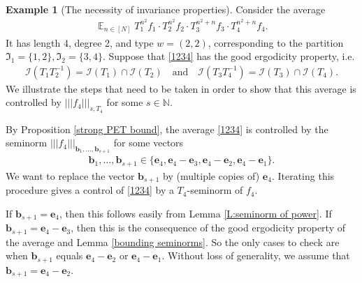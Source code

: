 \documentclass[11pt]{amsart}
\theoremstyle{definition}
\newtheorem{example}{Example}
\newcommand{\N}{{\mathbb N}}
\newcommand{\CI}{{\mathcal I}}
\newcommand{\FD}{{\mathfrak D}}
\newcommand{\FI}{{\mathfrak I}}
\newcommand{\be}{{\mathbf{e}}}
\renewcommand{\b}{{\textbf{b}}}
\newcommand{\nnorm}[1]{\lvert\!|\!| #1|\!|\!\rvert}
\newcommand{\inv}{^{-1}}
\DeclareMathOperator*{\E}{\mathbb{E}}
\begin{document}
\begin{example}[The necessity of invariance properties]\label{Ex: n^2, n^2, n^2+n, n^2+n}%
Consider the average
\begin{align}\label{1234}
     \E_{n\in[N]}T_1^{n^2}f_1 \cdot T_2^{n^2}f_2 \cdot T_3^{n^2+n}f_3 \cdot T_4^{n^2 + n} f_4.
\end{align}
It has length 4, degree 2, and type $w=(2,2)$, corresponding to the partition $\FI_1 = \{1, 2\}, \FI_2 = \{3, 4\}$. Suppose that \eqref{1234} has the good ergodicity property, i.e.
\begin{align*}
    \CI(T_1 T_2^{-1}) = \CI(T_1)\cap \CI(T_2)\quad \textrm{and}\quad \CI(T_3 T_4\inv) = \CI(T_3)\cap\CI(T_4).
\end{align*}
We illustrate the steps that need to be taken in order to show that this average is controlled by $\nnorm{f_4}_{s, T_4}$ for some $s\in\N$.

By Proposition \ref{strong PET bound}, the average \eqref{1234} is controlled by the seminorm $\nnorm{f_4}_{{\b_1}, \ldots, {\b_{s+1}}}$ for some vectors
\begin{align*}%
    \b_1, \ldots, \b_{s+1}\in\{\be_4, \be_4-\be_3, \be_4-\be_2, \be_4-\be_1\}.
\end{align*}
We want to replace the vector $\b_{s+1}$ by (multiple copies of) $\be_4$. Iterating this procedure gives a control of \eqref{1234} by a $T_4$-seminorm of $f_4$.

If $\b_{s+1}=\be_4$, then this follows easily from Lemma \ref{L:seminorm of power}. If $\b_{s+1} = \be_4-\be_3$, then this is the consequence of the good ergodicity property of the average and Lemma \ref{bounding seminorms}. So the only cases to check are when $\b_{s+1}$ equals $\be_4-\be_2$ or $\be_4-\be_1$. Without loss of generality, we assume that $\b_{s+1} = \be_4-\be_2$.


\end{example}
\end{document}
